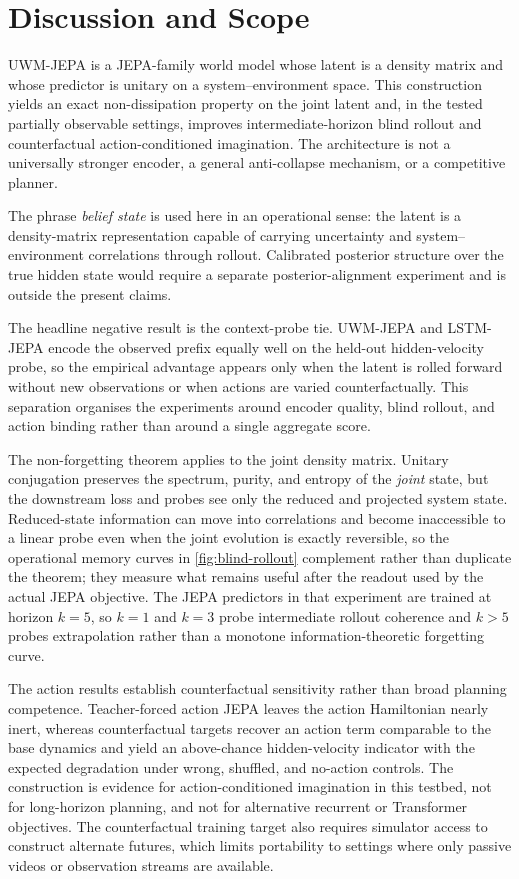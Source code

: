 \section{Discussion and Scope}
\label{sec:limitations}

UWM-JEPA is a JEPA-family world model whose latent is a density matrix
and whose predictor is unitary on a system--environment space. This
construction yields an exact non-dissipation property on the joint
latent and, in the tested partially observable settings, improves
intermediate-horizon blind rollout and counterfactual
action-conditioned imagination. The architecture is not a universally
stronger encoder, a general anti-collapse mechanism, or a competitive
planner.

The phrase \emph{belief state} is used here in an operational sense:
the latent is a density-matrix representation capable of carrying
uncertainty and system--environment correlations through rollout.
Calibrated posterior structure over the true hidden state would
require a separate posterior-alignment experiment and is outside the
present claims.

The headline negative result is the context-probe tie. UWM-JEPA and
LSTM-JEPA encode the observed prefix equally well on the held-out
hidden-velocity probe, so the empirical advantage appears only when
the latent is rolled forward without new observations or when actions
are varied counterfactually. This separation organises the experiments
around encoder quality, blind rollout, and action binding rather than
around a single aggregate score.

The non-forgetting theorem applies to the joint density matrix.
Unitary conjugation preserves the spectrum, purity, and entropy of the
\emph{joint} state, but the downstream loss and probes see only the
reduced and projected system state. Reduced-state information can
move into correlations and become inaccessible to a linear probe even
when the joint evolution is exactly reversible, so the operational
memory curves in \cref{fig:blind-rollout} complement rather than
duplicate the theorem; they measure what remains useful after the
readout used by the actual JEPA objective. The JEPA predictors in
that experiment are trained at horizon $k=5$, so $k=1$ and $k=3$
probe intermediate rollout coherence and $k>5$ probes extrapolation
rather than a monotone information-theoretic forgetting curve.

The action results establish counterfactual sensitivity rather than
broad planning competence. Teacher-forced action JEPA leaves the action
Hamiltonian nearly inert, whereas counterfactual targets recover an
action term comparable to the base dynamics and yield an above-chance
hidden-velocity indicator with the expected degradation under wrong,
shuffled, and no-action controls. The construction is evidence for
action-conditioned imagination in this testbed, not for long-horizon
planning, and not for alternative recurrent or Transformer objectives.
The counterfactual training target also requires simulator access to
construct alternate futures, which limits portability to settings where
only passive videos or observation streams are available.

